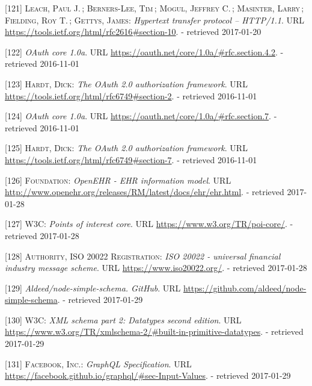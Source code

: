 \documentclass[12pt,english,a4paper,titlepage,cleardoublepage=empty,dottedtoc]{report}
\begin{document}
\hypertarget{ref-web_spec_http-error-codes}{}
{[}121{]} \textsc{Leach, Paul J.}\,; \textsc{Berners-Lee, Tim}\,;
\textsc{Mogul, Jeffrey C.}\,; \textsc{Masinter, Larry}\,;
\textsc{Fielding, Roy T.}\,; \textsc{Gettys, James}: \emph{Hypertext
transfer protocol -- HTTP/1.1}. URL
\url{https://tools.ietf.org/html/rfc2616\#section-10}. - retrieved
2017-01-20

\hypertarget{ref-web_spec_oauth-1a_client-reg}{}
{[}122{]} \emph{OAuth core 1.0a}. URL
\url{https://oauth.net/core/1.0a/\#rfc.section.4.2}. - retrieved
2016-11-01

\hypertarget{ref-web_spec_oauth-2_client-reg}{}
{[}123{]} \textsc{Hardt, Dick}: \emph{The OAuth 2.0 authorization
framework}. URL \url{https://tools.ietf.org/html/rfc6749\#section-2}. -
retrieved 2016-11-01

\hypertarget{ref-web_spec_oauth-1a_access-verification}{}
{[}124{]} \emph{OAuth core 1.0a}. URL
\url{https://oauth.net/core/1.0a/\#rfc.section.7}. - retrieved
2016-11-01

\hypertarget{ref-web_spec_oauth-2_access-verification}{}
{[}125{]} \textsc{Hardt, Dick}: \emph{The OAuth 2.0 authorization
framework}. URL \url{https://tools.ietf.org/html/rfc6749\#section-7}. -
retrieved 2016-11-01

\hypertarget{ref-web_spec_data-schemas_ehr}{}
{[}126{]} \textsc{Foundation}: \emph{OpenEHR - EHR information model}.
URL \url{http://www.openehr.org/releases/RM/latest/docs/ehr/ehr.html}. -
retrieved 2017-01-28

\hypertarget{ref-web_spec_data-schemas_poi}{}
{[}127{]} \textsc{W3C}: \emph{Points of interest core}. URL
\url{https://www.w3.org/TR/poi-core/}. - retrieved 2017-01-28

\hypertarget{ref-web_spec_data-schemas_bank-transfer}{}
{[}128{]} \textsc{Authority, ISO 20022 Registration}: \emph{ISO 20022 -
universal financial industry message scheme}. URL
\url{https://www.iso20022.org/}. - retrieved 2017-01-28

\hypertarget{ref-web_2017_repo_node-simple-schema}{}
{[}129{]} \emph{Aldeed/node-simple-schema. GitHub}. URL
\url{https://github.com/aldeed/node-simple-schema}. - retrieved
2017-01-29

\hypertarget{ref-web_spec_xml_types}{}
{[}130{]} \textsc{W3C}: \emph{XML schema part 2: Datatypes second
edition}. URL
\url{https://www.w3.org/TR/xmlschema-2/\#built-in-primitive-datatypes}.
- retrieved 2017-01-29

\hypertarget{ref-web_spec_graphql_types}{}
{[}131{]} \textsc{Facebook, Inc.}: \emph{GraphQL Specification}. URL
\url{https://facebook.github.io/graphql/\#sec-Input-Values}. - retrieved
2017-01-29
\end{document}
